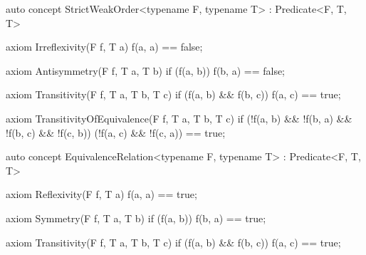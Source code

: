 \documentclass[american,twoside]{book}
\begin{document}
\begin{itemdescr}
\pnum 
{}

\pnum
{}
\end{itemdescr}

\begin{itemdecl}
auto concept StrictWeakOrder<typename F, typename T> : Predicate<F, T, T> {

  axiom Irreflexivity(F f, T a) { f(a, a) == false; }

  axiom Antisymmetry(F f, T a, T b) { 
    if (f(a, b)) 
      f(b, a) == false;
  }

  axiom Transitivity(F f, T a, T b, T c) {
    if (f(a, b) && f(b, c)) 
      f(a, c) == true;
  }

  axiom TransitivityOfEquivalence(F f, T a, T b, T c) {
    if (!f(a, b) && !f(b, a) && !f(b, c) && !f(c, b))
      (!f(a, c) && !f(c, a)) == true;
  }
}
\end{itemdecl}

\begin{itemdescr}
\pnum 
{}
\end{itemdescr}

\begin{itemdecl}
auto concept EquivalenceRelation<typename F, typename T> : Predicate<F, T, T> {
  axiom Reflexivity(F f, T a) { f(a, a) == true; }

  axiom Symmetry(F f, T a, T b) { 
    if (f(a, b)) 
      f(b, a) == true; 
  }

  axiom Transitivity(F f, T a, T b, T c) {
    if (f(a, b) && f(b, c))
      f(a, c) == true;
  }
}
\end{itemdecl}

\begin{itemdescr}
\pnum 
{}
\end{itemdescr}
\end{document}
